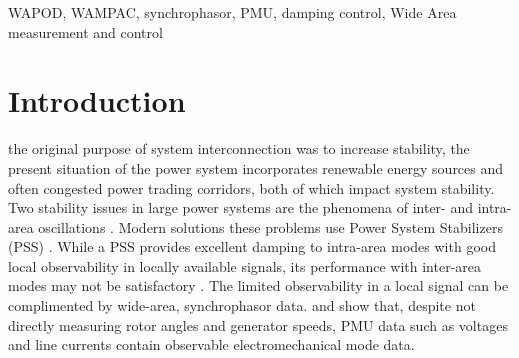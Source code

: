 \documentclass[journal]{IEEEtran}
\begin{document}
\begin{abstract}

\end{abstract}

\begin{IEEEkeywords}
WAPOD, WAMPAC, synchrophasor, PMU, damping control, Wide Area measurement and control
\end{IEEEkeywords}






%
\IEEEpeerreviewmaketitle



\section{Introduction}
 the original purpose of system interconnection was to increase stability, the present situation of the power system incorporates renewable energy sources and often congested power trading corridors, both of which impact system stability. Two stability issues in large power systems are the phenomena of inter- and intra-area oscillations \cite{KundurTwoArea}. Modern solutions these problems use Power System Stabilizers (PSS) \cite{WAPODNorway}. While a PSS provides excellent damping to intra-area modes with good local observability in locally available signals, its performance with inter-area modes may not be satisfactory \cite{localREMcomparison}. The limited observability in a local signal can be complimented by wide-area, synchrophasor data. \cite{USeventPhasor} and \cite{Yuwa} show that, despite not directly measuring rotor angles and generator speeds, PMU data such as voltages and line currents contain observable electromechanical mode data. 
\end{document}

